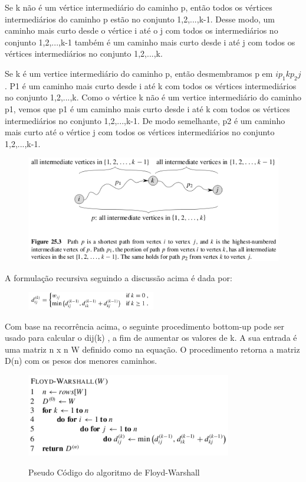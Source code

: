 \documentclass[a4paper,12pt]{article}
\begin{document}
Se k não é um vértice intermediário do caminho p, então todos os vértices intermediários do caminho p estão no conjunto {1,2,...,k-1}. Desse modo, um caminho mais curto desde o vértice i até o j com todos os intermediários no conjunto {1,2,...,k-1} também é um caminho mais curto desde i até j com todos os vértices intermediários no conjunto {1,2,...,k}.

Se k é um vertice intermediário do caminho p, então desmembramos p em $ip_1kp_2j$. P1 é um caminho mais curto desde i até k com todos os vértices intermediários no conjunto {1,2,...,k}. Como o vértice k não é um vertice intermediário do caminho p1, vemos que p1 é um caminho mais curto desde i até k com todos os vértices intermediários no conjunto {1,2,...,k-1}. De modo semelhante, p2 é um caminho mais curto até o vértice j com todos os vértices intermediários no conjunto {1,2,...,k-1}.

\begin{figure}[h!]
	\centering
	\includegraphics[width=1.0\textwidth]{djikstra}
	\label{fig:djikstra}
\end{figure}

A formulação recursiva seguindo a discussão acima é dada por:

\begin{figure}[h!]
	\centering
	\includegraphics[width=0.5\textwidth]{djikstra2}
	\label{fig:djistra_pd}
\end{figure}

Com base na recorrência acima, o  seguinte procedimento bottom-up  pode ser usado para calcular o dij(k) , a fim de aumentar os valores de k. A sua entrada é uma matriz n x n W definido como na equação. O procedimento retorna a matriz D(n) com os pesos dos menores caminhos.

\begin{figure}[h!]
	\centering
	\includegraphics[width=0.8\textwidth]{floyd-warshall}
	\label{fig:floyd-warshall}
	\caption{Pseudo Código do algoritmo de Floyd-Warshall}
\end{figure}
\end{document}
